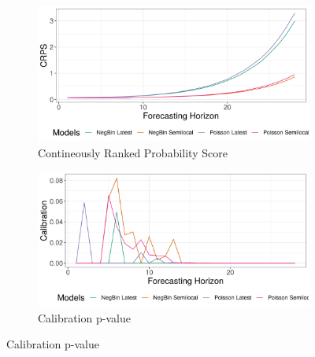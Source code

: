 \begin{figure}[H]
\begin{subfigure}{0.5\textwidth}
  \centering
  \includegraphics[width=\linewidth]{../output/Biena_crps.png}  
  \caption{Contineously Ranked Probability Score}
  \label{fig:sub-first}
\end{subfigure}
\begin{subfigure}{0.5\textwidth}
  \centering
  \includegraphics[width=\linewidth]{../output/Biena_calibration.png}  
  \caption{Calibration p-value}
  \label{fig:sub-second}
\end{subfigure}


\end{figure}
